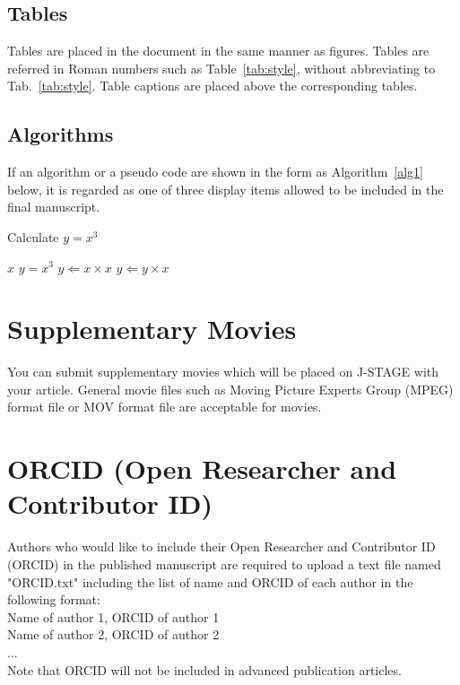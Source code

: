 \documentclass{comex}
\begin{document}
\subsection{Tables}

Tables are placed in the document in the same manner as figures. Tables
are referred in Roman numbers such as Table~\ref{tab:style}, without
abbreviating to Tab.~\ref{tab:style}. Table captions are placed above
the corresponding tables.

\subsection{Algorithms}
If an algorithm or a pseudo code are shown in the form as Algorithm~\ref{alg1} below,
it is regarded as one of three display items allowed to be included in the final manuscript.
 
\begin{algorithm}[h]
\caption{Calculate $y = x^3$}
\label{alg1}
\begin{algorithmic}
\REQUIRE $x$
\ENSURE $y = x^3$
\STATE $y \Leftarrow x \times x$
\STATE $y \Leftarrow y \times x$
\end{algorithmic}
\end{algorithm}

\section{Supplementary Movies}

You can submit supplementary movies which will be placed on J-STAGE with your article.
General movie files such as Moving Picture Experts
Group (MPEG) format file or MOV format file are acceptable for movies.

\section{ORCID (Open Researcher and Contributor ID)}

Authors who would like to include their Open Researcher and Contributor ID (ORCID) in the
 published manuscript are required to upload a text file named "ORCID.txt" including 
 the list of name and ORCID of each author in the following format:\\
Name of author 1, ORCID of author 1\\
Name of author 2, ORCID of author 2\\
...\\
Note that ORCID will not be included in advanced publication articles.
\end{document}
